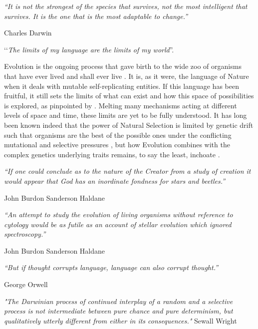 \textit{“It is not the strongest of the species that survives,
not the most intelligent that survives.
It is the one that is the most adaptable to change.”}

Charles Darwin



‘‘\textit{The limits of my language are the limits of my world}''.

\citep{Wittgenstein22}

Evolution is the ongoing process that gave birth to the wide zoo of organisms that have ever lived and shall ever live \citep{Darwin59,Wallace58}. It is, as it were, the language of Nature when it deals with mutable self-replicating entities. If this language has been fruitful, it still sets the limits of what can exist and how this space of possibilities is explored, as pinpointed by \citet{Wittgenstein22}. Melting many mechanisms acting at different levels of space and time, these limits are yet to be fully understood. It has long been known indeed that the power of Natural Selection is limited by genetic drift \citep{Wright30} such that organisms are the best of the possible ones under the conflicting mutational and selective pressures \citep{Kimura62,Ohta92}, but how Evolution combines with the complex genetics underlying traits remains, to say the least, inchoate \citep{Hansen13,Blanquart16,Barton17,Harpak21}.

\textit{“If one could conclude as to the nature of the Creator from a study of creation it would appear that God has an inordinate fondness for stars and beetles.”}

John Burdon Sanderson Haldane

\textit{“An attempt to study the evolution of living organisms without reference to cytology would be as futile as an account of stellar evolution which ignored spectroscopy.”}

John Burdon Sanderson Haldane

\textit{“But if thought corrupts language, language can also corrupt thought.”}

George Orwell

\textit{"The Darwinian process of continued interplay of a random and a selective process is not intermediate between pure chance and pure determinism, but qualitatively utterly different from either in its consequences."}
Sewall Wright